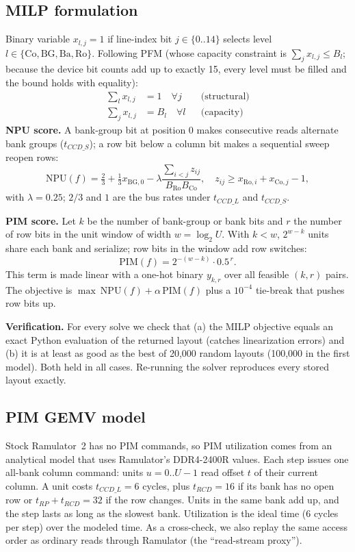 \documentclass[conference]{IEEEtran}
\begin{document}
\subsection{MILP formulation}
Binary variable $x_{l,j}=1$ if line-index bit $j\in\{0..14\}$ selects level $l\in\{\mathrm{Co},\mathrm{BG},\mathrm{Ba},\mathrm{Ro}\}$. Following PFM (whose capacity constraint is $\sum_j x_{l,j}\le B_l$; because the device bit counts add up to exactly 15, every level must be filled and the bound holds with equality):
\begin{align}
\textstyle\sum_{l} x_{l,j} &= 1 \quad \forall j &&\text{(structural)}\\
\textstyle\sum_{j} x_{l,j} &= B_l \quad \forall l &&\text{(capacity)}
\end{align}
\textbf{NPU score.} A bank-group bit at position 0 makes consecutive reads alternate bank groups ($t_{CCD\_S}$); a row bit below a column bit makes a sequential sweep reopen rows:
\begin{equation}
\mathrm{NPU}(f) = \tfrac{2}{3} + \tfrac{1}{3}x_{\mathrm{BG},0} - \lambda \frac{\sum_{i<j} z_{ij}}{B_{\mathrm{Ro}}B_{\mathrm{Co}}},\quad z_{ij}\ge x_{\mathrm{Ro},i}+x_{\mathrm{Co},j}-1,
\end{equation}
with $\lambda=0.25$; $2/3$ and $1$ are the bus rates under $t_{CCD\_L}$ and $t_{CCD\_S}$.

\textbf{PIM score.} Let $k$ be the number of bank-group or bank bits and $r$ the number of row bits in the unit window of width $w=\log_2 U$. With $k<w$, $2^{w-k}$ units share each bank and serialize; row bits in the window add row switches:
\begin{equation}
\mathrm{PIM}(f) = 2^{-(w-k)}\cdot 0.5^{\,r}.
\end{equation}
This term is made linear with a one-hot binary $y_{k,r}$ over all feasible $(k,r)$ pairs. The objective is $\max\ \mathrm{NPU}(f)+\alpha\,\mathrm{PIM}(f)$ plus a $10^{-4}$ tie-break that pushes row bits up.

\textbf{Verification.} For every solve we check that (a) the MILP objective equals an exact Python evaluation of the returned layout (catches linearization errors) and (b) it is at least as good as the best of 20,000 random layouts (100,000 in the first model). Both held in all cases. Re-running the solver reproduces every stored layout exactly.

\subsection{PIM GEMV model}
Stock Ramulator~2 has no PIM commands, so PIM utilization comes from an analytical model that uses Ramulator's DDR4-2400R values. Each step issues one all-bank column command: units $u=0..U{-}1$ read offset $t$ of their current column. A unit costs $t_{CCD\_L}=6$ cycles, plus $t_{RCD}=16$ if its bank has no open row or $t_{RP}+t_{RCD}=32$ if the row changes. Units in the same bank add up, and the step lasts as long as the slowest bank. Utilization is the ideal time ($6$ cycles per step) over the modeled time. As a cross-check, we also replay the same access order as ordinary reads through Ramulator (the ``read-stream proxy'').
\end{document}
